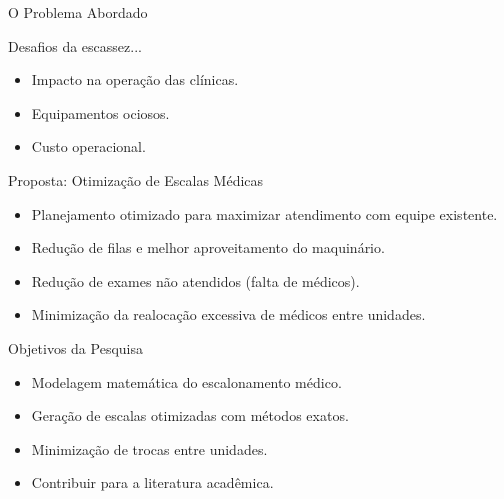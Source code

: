 \begin{frame}{O Problema Abordado}

    \begingroup
    \begin{block}{Desafios da escassez...}
        \begin{itemize}
            \item Impacto na operação das clínicas.
            \item Equipamentos ociosos.
            \item Custo operacional.
        \end{itemize}
    \end{block}
    \endgroup

    \begingroup
    \begin{block}{Proposta: Otimização de Escalas Médicas}
        \begin{itemize}
            \item Planejamento otimizado para maximizar atendimento com equipe existente.
            \item Redução de filas e melhor aproveitamento do maquinário.
            \item Redução de exames não atendidos (falta de médicos).
            \item Minimização da realocação excessiva de médicos entre unidades.
        \end{itemize}
    \end{block}
    \endgroup

\end{frame}

\begin{frame}{Objetivos da Pesquisa }
    \begin{block}{}
        \begin{itemize}
            \item Modelagem matemática do escalonamento médico.
            \item Geração de escalas otimizadas com métodos exatos.
            \item Minimização de trocas entre unidades.
            \item Contribuir para a literatura acadêmica.
        \end{itemize}
    \end{block}
\end{frame}